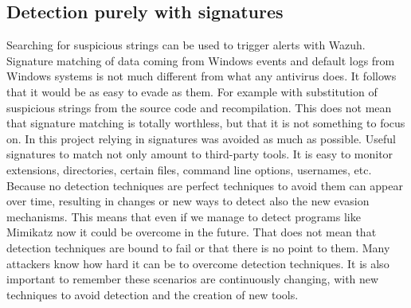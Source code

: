 \subsection{Detection purely with signatures}
Searching for suspicious strings can be used to trigger alerts with Wazuh.
Signature matching of data coming from Windows events and default logs from Windows systems is not much different from what any antivirus does. It follows that it would be as easy to evade as them. For example with substitution of suspicious strings from the source code and recompilation\cite{understanding_powersploit_mimikatz}.
\linej
\linej
This does not mean that signature matching is totally worthless, but that it is not something to focus on. In this project relying in signatures was avoided as much as possible.
Useful signatures to match not only amount to third-party tools. It is easy to monitor extensions, directories, certain files, command line options, usernames, etc.
\linej
\linej
Because no detection techniques are perfect techniques to avoid them can appear over time, resulting in changes or new ways to detect also the new evasion mechanisms.
This means that even if we manage to detect programs like Mimikatz now it could be overcome in the future.
\linej
That does not mean that detection techniques are bound to fail or that there is no point to them.
Many attackers know how hard it can be to overcome detection techniques.
\linej
It is also important to remember these scenarios are continuously changing, with new techniques to avoid detection and the creation of new tools.

